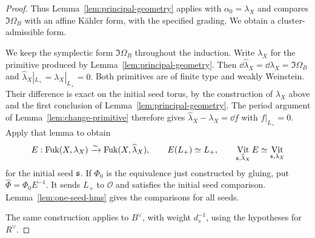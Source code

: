 \documentclass[12pt, letter]{amsart}
\theoremstyle{definition}
\newcommand{\OO}{\mathcal O}
\DeclareMathOperator{\Vit}{Vit}
\numberwithin{equation}{section}
\begin{document}
\begin{proof}
Thus Lemma~\ref{lem:principal-geometry} applies with
$\alpha_0=\lambda_X$ and compares $\Im\Omega_B$ with an affine
K\"ahler form, with the specified grading. We obtain a cluster-admissible form. 



We keep the symplectic form $\Im\Omega_B$ throughout the induction.
Write $\widehat\lambda_X$ for the primitive produced by
Lemma~\ref{lem:principal-geometry}. Then
$
 \dd\widehat\lambda_X=\dd\lambda_X=\Im\Omega_B$ and 
$
 \widehat\lambda_X|_{L_+}=\lambda_X|_{L_+}=0.$
Both primitives are of finite type and weakly Weinstein.
Their difference is exact on the initial seed torus, by the construction
of $\lambda_X$ above and the first conclusion of
Lemma~\ref{lem:principal-geometry}. The period argument of
Lemma~\ref{lem:change-primitive} therefore gives
$\widehat\lambda_X-\lambda_X=\dd f$ with $f|_{L_+}=0$.
Apply that lemma to obtain
\[
 E:\Fuk(X,\lambda_X)\xrightarrow{\sim}\Fuk(X,\widehat\lambda_X),
 \qquad E(L_+)\simeq L_+,
 \qquad \Vit_{\fs,\widehat\lambda_X}E\simeq\Vit_{\fs,\lambda_X}
\]
for the initial seed $\mathfrak{s}$.
If $\Phi_0$ is the equivalence just constructed by gluing, put
$\widehat\Phi=\Phi_0E^{-1}$.
It sends $L_+$ to $\OO$ and satisfies the initial seed comparison.
Lemma~\ref{lem:one-seed-hms} gives the comparisons for all seeds.


The same construction applies to $B^\vee$, with weight $d_s^{-1}$,
using the hypotheses for $R^\vee$.
\end{proof}
\end{document}
